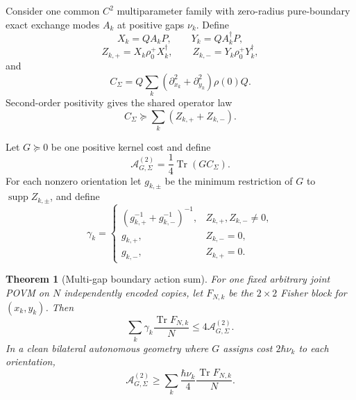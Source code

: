 \documentclass[aps,pra,preprint,nofootinbib]{revtex4-2}
\newtheorem{theorem}{Theorem}
\newcommand{\Tr}{\operatorname{Tr}}
\newcommand{\supp}{\operatorname{supp}}
\newcommand{\rhozero}{\rho_0}
\newcommand{\Fcl}{F}
\newcommand{\Aact}{\mathcal A}
\begin{document}
Consider one common $C^2$ multiparameter family with zero-radius pure-boundary exact exchange modes $A_k$ at positive gaps $\nu_k$. Define
\begin{equation}
X_k=QA_kP,\qquad Y_k=QA_k^\dagger P,
\end{equation}
\begin{equation}
Z_{k,+}=X_k\rhozero^+X_k^\dagger,
\qquad
Z_{k,-}=Y_k\rhozero^+Y_k^\dagger,
\end{equation}
and
\begin{equation}
C_\Sigma=
Q\sum_k(\partial_{x_k}^2+\partial_{y_k}^2)\rho(0)Q.
\label{eq:Csigma}
\end{equation}
Second-order positivity gives the shared operator law
\begin{equation}
\boxed{
C_\Sigma\succeq\sum_k(Z_{k,+}+Z_{k,-}).
}
\label{eq:Csigma-bound}
\end{equation}

Let $G\succeq0$ be one positive kernel cost and define
\begin{equation}
\Aact_{G,\Sigma}^{(2)}=\frac14\Tr(GC_\Sigma).
\end{equation}
For each nonzero orientation let $g_{k,\pm}$ be the minimum restriction of $G$ to $\supp Z_{k,\pm}$, and define
\begin{equation}
\gamma_k=
\begin{cases}
(g_{k,+}^{-1}+g_{k,-}^{-1})^{-1},&Z_{k,+},Z_{k,-}\ne0,\\
g_{k,+},&Z_{k,-}=0,\\
g_{k,-},&Z_{k,+}=0.
\end{cases}
\label{eq:gammak}
\end{equation}

\begin{theorem}[Multi-gap boundary action sum]
\label{thm:multigap}
For one fixed arbitrary joint POVM on $N$ independently encoded copies, let $\Fcl_{N,k}$ be the $2\times2$ Fisher block for $(x_k,y_k)$. Then
\begin{equation}
\boxed{
\sum_k\gamma_k\frac{\Tr \Fcl_{N,k}}{N}
\le4\Aact_{G,\Sigma}^{(2)}.
}
\label{eq:multigap-general}
\end{equation}
In a clean bilateral autonomous geometry where $G$ assigns cost $2\hbar\nu_k$ to each orientation,
\begin{equation}
\boxed{
\Aact_{G,\Sigma}^{(2)}
\ge
\sum_k\frac{\hbar\nu_k}{4}
\frac{\Tr \Fcl_{N,k}}{N}.
}
\label{eq:multigap-clean}
\end{equation}
\end{theorem}
\end{document}
